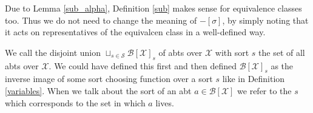 \begin{remark}
    Due to Lemma \ref{sub_alpha}, Definition \ref{sub} makes sense for equivalence classes too. Thus we do not need to change the meaning of $-[\sigma]$, by simply noting that it acts on representatives of the equivalcen class in a well-defined way.
\end{remark}

\begin{defin}
    We call the disjoint union $\sqcup_{s \in \mathcal{S}} \mathcal{B}[\mathcal{X}]_s$ of abts over $\mathcal{X}$ with sort $s$ the set of all abts over $\mathcal{X}$. We could have defined this first and then defined $\mathcal{B}[\mathcal{X}]_s$ as the inverse image of some sort choosing function over a sort $s$ like in Definition \ref{variables}. When we talk about the sort of an abt $a \in \mathcal{B}[\mathcal{X}]$ we refer to the $s$ which corresponds to the set in which $a$ lives. 
\end{defin}
